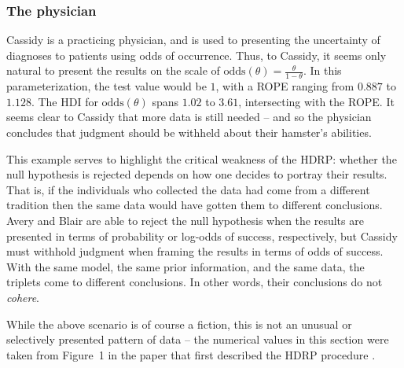 \documentclass[man]{apa}
\newcommand{\hdr}{HDRP}
\newcommand{\oddss}{\text{odds}}
\begin{document}
\subsubsection{The physician}
Cassidy is a practicing physician, and is used to presenting the uncertainty of diagnoses to patients using odds of occurrence. Thus, to Cassidy, it seems only natural to present the results on the scale of $\oddss(\theta)=\frac{\theta}{1-\theta}$. In this parameterization, the test value would be $1$, with a ROPE ranging from $0.887$ to $1.128$. The HDI for $\oddss(\theta)$ spans $1.02$ to $3.61$, intersecting with the ROPE.  
It seems clear to Cassidy that more data is still needed -- and so the physician concludes that judgment should be withheld about their hamster's abilities. 

This example serves to highlight the critical weakness of the \hdr{}: whether the null hypothesis is rejected depends on how one decides to portray their results.  That is, if the individuals who collected the data had come from a different tradition then the same data would have gotten them to different conclusions. Avery and Blair are able to reject the null hypothesis when the results are presented in terms of probability or log-odds of success, respectively, but Cassidy must withhold judgment when framing the results in terms of odds of success.  With the same model, the same prior information, and the same data, the triplets come to different conclusions. In other words, their conclusions do not \textit{cohere}. 

While the above scenario is of course a fiction, this is not an unusual or selectively presented pattern of data -- the numerical values in this section were taken from Figure~1 in the paper that first described the \hdr{} procedure \cite{Kruschke2011}.
\end{document}
